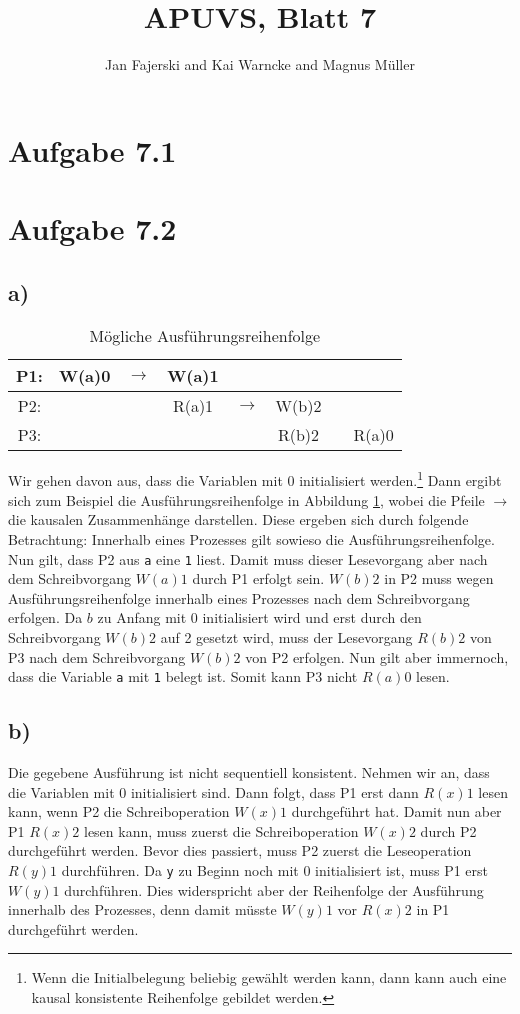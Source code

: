 \documentclass[a4paper,
12pt,
BCOR12mm,
]{scrartcl}
\title{APUVS, Blatt 7}
\author{Jan Fajerski and Kai Warncke and Magnus Müller}
\theoremstyle{break}
\begin{document}

\maketitle 

\section*{Aufgabe 7.1}
{\color{red}{Muss noch erledigt werden.}}
\section*{Aufgabe 7.2}
\subsection*{a)}
\begin{table}
  \centering
  \begin{tabular}{|cccccccc}
      \hline
      P1: & W(a)0 & $\rightarrow$ & W(a)1 && && \\
      \hline
      P2: & && R(a)1 & $\rightarrow$ & W(b)2 && \\
      \hline
      P3: & && && R(b)2 & & R(a)0 \\
      \hline
  \end{tabular}
  \caption{Mögliche Ausführungsreihenfolge}
  \label{tab:72a}
\end{table}
Wir gehen davon aus, dass die Variablen mit 0 initialisiert werden.\footnote{Wenn die
Initialbelegung beliebig gewählt werden kann, dann kann auch eine kausal konsistente
Reihenfolge gebildet werden.} Dann ergibt sich zum
Beispiel die Ausführungsreihenfolge in Abbildung \ref{tab:72a}, wobei die Pfeile $\rightarrow$ die kausalen
Zusammenhänge darstellen. Diese ergeben sich durch folgende Betrachtung: Innerhalb eines
Prozesses gilt sowieso die Ausführungsreihenfolge. Nun gilt, dass P2 aus \verb|a| eine
\verb|1| liest. Damit muss dieser Lesevorgang aber nach dem Schreibvorgang $W(a)1$ durch
P1 erfolgt sein. $W(b)2$ in P2 muss wegen Ausführungsreihenfolge innerhalb eines Prozesses
nach dem Schreibvorgang erfolgen. Da $b$ zu Anfang mit $0$ initialisiert wird und erst
durch den Schreibvorgang $W(b)2$ auf 2 gesetzt wird, muss der Lesevorgang $R(b)2$ von P3
nach dem Schreibvorgang $W(b)2$ von P2 erfolgen. Nun gilt aber immernoch, dass die
Variable \verb|a| mit \verb|1| belegt ist. Somit kann P3 nicht $R(a)0$ lesen.
\subsection*{b)}
Die gegebene Ausführung ist nicht sequentiell konsistent. Nehmen wir an, dass die
Variablen mit 0 initialisiert sind. Dann folgt, dass P1 erst dann $R(x)1$ lesen kann, wenn
P2 die Schreiboperation $W(x)1$ durchgeführt hat. Damit nun aber P1 $R(x)2$ lesen kann,
muss zuerst die Schreiboperation $W(x)2$ durch P2 durchgeführt werden. Bevor dies
passiert, muss P2 zuerst die Leseoperation $R(y)1$ durchführen. Da \verb|y| zu Beginn noch
mit 0 initialisiert ist, muss P1 erst $W(y)1$ durchführen. Dies widerspricht aber der
Reihenfolge der Ausführung innerhalb des Prozesses, denn damit müsste $W(y)1$ vor $R(x)2$
in P1 durchgeführt werden.
\end{document}

